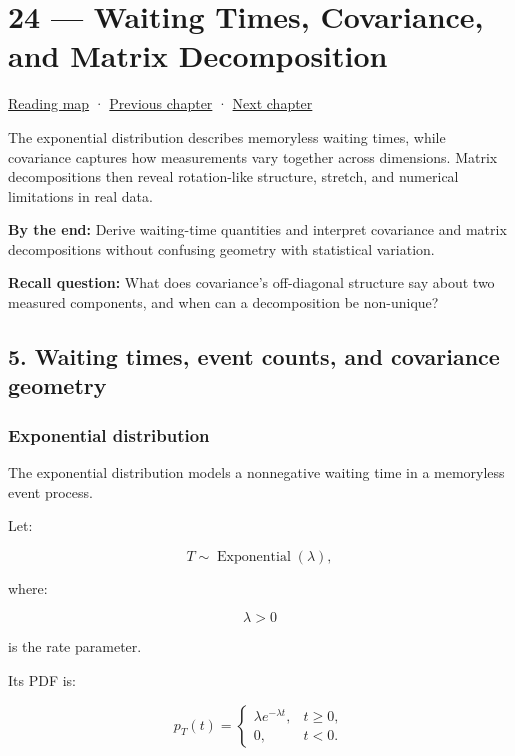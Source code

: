 \hypertarget{02-foundations-ii-ch024}{}
\chapter{24 --- Waiting Times, Covariance, and Matrix Decomposition}\label{02-foundations-ii-ch024-waiting-times-covariance-and-matrix-decomposition}

\hyperref[volume-reading-map]{Reading map} · \hyperref[02-foundations-ii-ch023-probability-models-and-measurement-error]{Previous chapter} · \hyperref[02-foundations-ii-ch025-continuous-models-and-numerical-error]{Next chapter}

The exponential distribution describes memoryless waiting times, while covariance captures how measurements vary together across dimensions. Matrix decompositions then reveal rotation-like structure, stretch, and numerical limitations in real data.

\textbf{By the end:} Derive waiting-time quantities and interpret covariance and matrix decompositions without confusing geometry with statistical variation.

\textbf{Recall question:} What does covariance's off-diagonal structure say about two measured components, and when can a decomposition be non-unique?

\section{5. Waiting times, event counts, and covariance geometry}\label{02-foundations-ii-ch024-waiting-times-event-counts-and-covariance-geometry}

\subsection{Exponential distribution}\label{02-foundations-ii-ch024-exponential-distribution}

The exponential distribution models a nonnegative waiting time in a memoryless event process.

Let:

\[
 T\sim\operatorname{Exponential}(\lambda),
\]

where:

\[
 \lambda>0
\]

is the rate parameter.

Its PDF is:

\[
 \boxed{ p_T(t)= \begin{cases} \lambda e^{-\lambda t},&t\ge0,\\ 0,&t<0. \end{cases} }
\]

